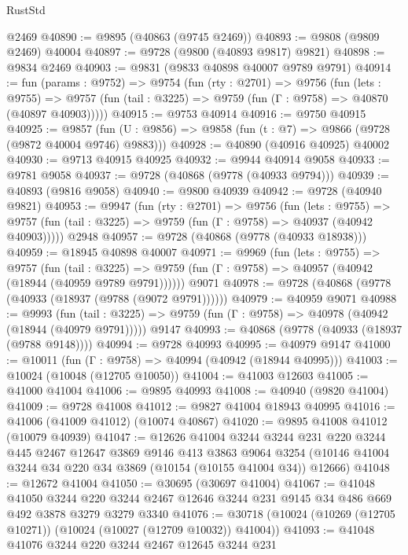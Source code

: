 \begin{lexlean}{RustStd}
\begin{coremodule}
    @2469
@40890 := @9895 (@40863 (@9745 @2469))
@40893 := @9808 (@9809 @2469) @40004
@40897 := @9728 (@9800 (@40893 @9817) @9821)
@40898 := @9834 @2469
@40903 := @9831 (@9833 @40898 @40007 @9789 @9791)
@40914 := fun (params : @9752) =>
  @9754
    (fun (rty : @2701) =>
    @9756
      (fun (lets : @9755) =>
      @9757 (fun (tail : @3225) => @9759 (fun (Γ : @9758) => @40870 (@40897 @40903)))))
@40915 := @9753 @40914
@40916 := @9750 @40915
@40925 := @9857
    (fun (U : @9856) => @9858 (fun (t : @7) => @9866 (@9728 (@9872 @40004 @9746) @9883)))
@40928 := @40890 (@40916 @40925) @40002
@40930 := @9713 @40915 @40925
@40932 := @9944 @40914 @9058
@40933 := @9781 @9058
@40937 := @9728 (@40868 (@9778 (@40933 @9794)))
@40939 := @40893 (@9816 @9058)
@40940 := @9800 @40939
@40942 := @9728 (@40940 @9821)
@40953 := @9947
    (fun (rty : @2701) =>
    @9756
      (fun (lets : @9755) =>
      @9757 (fun (tail : @3225) => @9759 (fun (Γ : @9758) => @40937 (@40942 @40903)))))
    @2948
@40957 := @9728 (@40868 (@9778 (@40933 @18938)))
@40959 := @18945 @40898 @40007
@40971 := @9969
    (fun (lets : @9755) =>
    @9757
      (fun (tail : @3225) =>
      @9759 (fun (Γ : @9758) => @40957 (@40942 (@18944 (@40959 @9789 @9791))))))
    @9071
@40978 := @9728 (@40868 (@9778 (@40933 (@18937 (@9788 (@9072 @9791))))))
@40979 := @40959 @9071
@40988 := @9993
    (fun (tail : @3225) => @9759 (fun (Γ : @9758) => @40978 (@40942 (@18944 (@40979 @9791)))))
    @9147
@40993 := @40868 (@9778 (@40933 (@18937 (@9788 @9148))))
@40994 := @9728 @40993
@40995 := @40979 @9147
@41000 := @10011 (fun (Γ : @9758) => @40994 (@40942 (@18944 @40995)))
@41003 := @10024 (@10048 (@12705 @10050))
@41004 := @41003 @12603
@41005 := @41000 @41004
@41006 := @9895 @40993
@41008 := @40940 (@9820 @41004)
@41009 := @9728 @41008
@41012 := @9827 @41004 @18943 @40995
@41016 := @41006 (@41009 @41012) (@10074 @40867)
@41020 := @9895 @41008 @41012 (@10079 @40939)
@41047 := @12626
    @41004
    @3244
    @3244
    @231
    @220
    @3244
    @445
    @2467
    @12647
    @3869
    @9146
    @413
    @3863
    @9064
    @3254
    (@10146 @41004 @3244 @34 @220 @34 @3869 (@10154 (@10155 @41004 @34)) @12666)
@41048 := @12672 @41004
@41050 := @30695 (@30697 @41004)
@41067 := @41048
    @41050
    @3244
    @220
    @3244
    @2467
    @12646
    @3244
    @231
    @9145
    @34
    @486
    @669
    @492
    @3878
    @3279
    @3279
    @3340
@41076 := @30718 (@10024 (@10269 (@12705 @10271)) (@10024 (@10027 (@12709 @10032)) @41004))
@41093 := @41048
    @41076
    @3244
    @220
    @3244
    @2467
    @12645
    @3244
    @231

\end{coremodule}
\end{lexlean}
